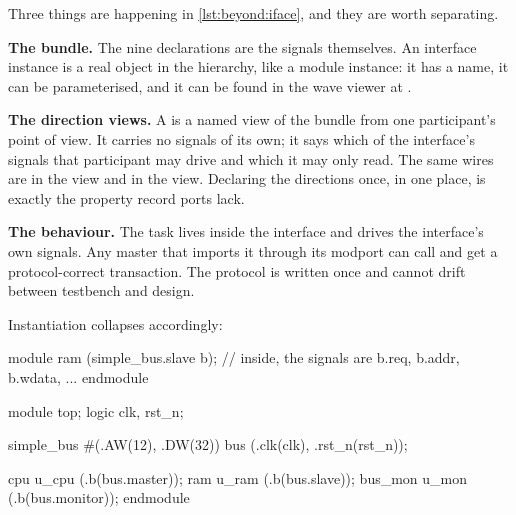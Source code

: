 Three things are happening in \cref{lst:beyond:iface}, and they are worth
separating.

\textbf{The bundle.} The nine  declarations are the signals
themselves. An interface instance is a real object in the hierarchy, like a
module instance: it has a name, it can be parameterised, and it can be found
in the wave viewer at .

\textbf{The direction views.} A  is a named view of
the bundle from one participant's point of view. It carries no signals of its
own; it says which of the interface's signals that participant may drive and
which it may only read. The same wires are  in the
 view and  in the  view. Declaring the
directions once, in one place, is exactly the property \VHDL{} record ports
lack.

\textbf{The behaviour.} The  task lives inside the interface and
drives the interface's own signals. Any master that imports it through its
modport can call  and get a
protocol-correct transaction. The protocol is written once and cannot drift
between testbench and design.

Instantiation collapses accordingly:

\begin{svcode}[caption={Instantiating the interface: one connection instead of fifteen},label={lst:beyond:ifaceinst}]
module ram (simple_bus.slave b);
  // inside, the signals are b.req, b.addr, b.wdata, ...
endmodule

module top;
  logic clk, rst_n;

  simple_bus #(.AW(12), .DW(32)) bus (.clk(clk), .rst_n(rst_n));

  cpu     u_cpu (.b(bus.master));
  ram     u_ram (.b(bus.slave));
  bus_mon u_mon (.b(bus.monitor));
endmodule
\end{svcode}


